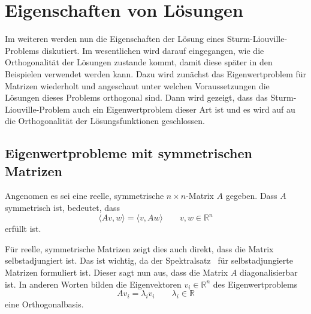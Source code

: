 %
%
%

%

\section{Eigenschaften von Lösungen
\label{sturmliouville:sec:solution-properties}}

Im weiteren werden nun die Eigenschaften der Lösung eines
Sturm-Liouville-Problems diskutiert.
Im wesentlichen wird darauf eingegangen, wie die Orthogonalität der Lösungen
zustande kommt, damit diese später in den Beispielen verwendet werden kann.
Dazu wird zunächst das Eigenwertproblem für Matrizen wiederholt und angeschaut
unter welchen Voraussetzungen die Lösungen dieses Problems orthogonal sind.
Dann wird gezeigt, dass das Sturm-Liouville-Problem auch ein Eigenwertproblem
dieser Art ist und es wird auf au die Orthogonalität der Lösungsfunktionen
geschlossen.

\subsection{Eigenwertprobleme mit symmetrischen Matrizen
\label{sturmliouville:sec:eigenvalue-problem-matrix}}


Angenomen es sei eine reelle, symmetrische $n \times n$-Matrix $A$ gegeben.
Dass $A$ symmetrisch ist, bedeutet, dass
\[
    \langle Av, w \rangle
    =
    \langle v, Aw \rangle
    \qquad
    v, w \in \mathbb{R}^n
\]
erfüllt ist.

Für reelle, symmetrische Matrizen zeigt dies auch direkt, dass die Matrix
selbstadjungiert ist.
Das ist wichtig, da der Spektralsatz~\cite{sturmliouville:spektralsatz-wiki}
für selbstadjungierte Matrizen formuliert ist. Dieser sagt nun aus, dass die
Matrix $A$ diagonalisierbar ist.
In anderen Worten bilden die Eigenvektoren $v_i \in \mathbb{R}^n$ des 
Eigenwertproblems
\[
    A v_i
    =
    \lambda_i v_i
    \qquad \lambda_i \in \mathbb{R}
\]
eine Orthogonalbasis.


